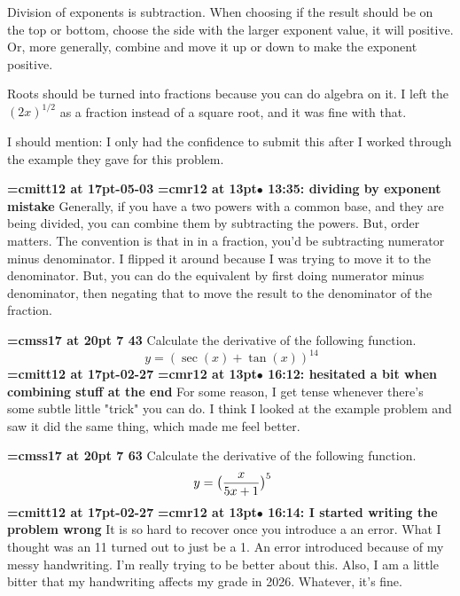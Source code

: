 Division of exponents is subtraction. When choosing if the result should be on the top or bottom, choose the side with the larger exponent value, it will positive. Or, more generally, combine and move it up or down to make the exponent positive.
\par

Roots should be turned into fractions because you can do algebra on it. I left the $(2x)^{1/2}$ as a fraction instead of a square root, and it was fine with that.
\par

I should mention: I only had the confidence to submit this after I worked through the example they gave for this problem.
\par

{\medskip\noindent\bf\font\titlefont=cmitt12 at 17pt-05-03}\medskip
{\smallskip\noindent\bf\font\titlefont=cmr12 at 13pt\titlefont $\bullet$ 13:35: dividing by exponent mistake}\smallskip
Generally, if you have a two powers with a common base, and they are being divided, you can combine them by subtracting the powers. But, order matters. The convention is that in in a fraction, you'd be subtracting numerator minus denominator. I flipped it around because I was trying to move it to the denominator. But, you can do the equivalent by first doing numerator minus denominator, then negating that to move the result to the denominator of the fraction.
\par

{\medskip\noindent\bf\font\titlefont=cmss17 at 20pt 7 43}\medskip
Calculate the derivative of the following function.
$$\
y = (\sec(x) + \tan(x))^{14}
$$
{\medskip\noindent\bf\font\titlefont=cmitt12 at 17pt-02-27}\medskip
{\smallskip\noindent\bf\font\titlefont=cmr12 at 13pt\titlefont $\bullet$ 16:12: hesitated a bit when combining stuff at the end}\smallskip
For some reason, I get tense whenever there's some subtle little "trick" you can do. I think I looked at the example problem and saw it did the same thing, which made me feel better.
\par

{\medskip\noindent\bf\font\titlefont=cmss17 at 20pt 7 63}\medskip
Calculate the derivative of the following function.
$$\
y = \big( {x \over 5x + 1} \big)^5
$$
{\medskip\noindent\bf\font\titlefont=cmitt12 at 17pt-02-27}\medskip
{\smallskip\noindent\bf\font\titlefont=cmr12 at 13pt\titlefont $\bullet$ 16:14: I started writing the problem wrong}\smallskip
It is so hard to recover once you introduce a an error. What I thought was an 11 turned out to just be a 1. An error introduced because of my messy handwriting. I'm really trying to be better about this. Also, I am a little bitter that my handwriting affects my grade in 2026. Whatever, it's fine.
\par

